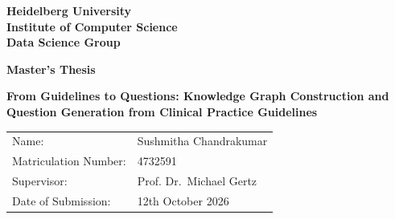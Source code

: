 \begin{titlepage}


\vspace*{1cm}
\begin{center}
\vspace*{3cm}
\textbf{ 
\Large  Heidelberg University\\
\smallskip
\Large Institute of Computer Science\\
\smallskip
\Large Data Science Group\\
\smallskip
}

\vspace{3cm}


\textbf{\large Master's Thesis} 

\vspace{0.5\baselineskip}
{\huge
\textbf{From Guidelines to Questions: Knowledge Graph Construction and Question Generation from Clinical Practice Guidelines}
}
\end{center}

\vfill 

{\large
\begin{tabular}[l]{ll}
Name: & Sushmitha Chandrakumar\\
Matriculation Number: & 4732591\\
Supervisor: & Prof. Dr.~Michael Gertz\\
Date of Submission: & 12th October 2026\\
\end{tabular}
}

\end{titlepage}
